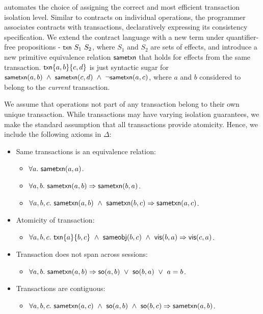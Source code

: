 \quelea automates the choice of assigning the correct and most efficient
transaction isolation level. Similar to contracts on individual operations, the
programmer associates contracts with transactions, declaratively expressing its
consistency specification. We extend the contract language with a new term
under quantifier-free propositions - ${\small {\normalfont \textsf{txn}}}~S_1~S_2$, where $S_1$ and
$S_2$ are sets of effects, and introduce a new primitive equivalence relation
$\small {\normalfont \textsf{sametxn}}$ that holds for effects from the same transaction. $\small
{\normalfont \textsf{txn}}\{a,b\}\{c,d\}$ is just syntactic sugar for $\small {\normalfont \textsf{sametxn}(a,b)} ~\wedge~
{\normalfont \textsf{sametxn}(c,d)} ~\wedge~ \neg{\normalfont \textsf{sametxn}(a,c)}$, where $a$ and $b$ considered to
belong to the \emph{current} transaction.

We assume that operations not part of any transaction belong to their own
unique transaction. While transactions may have varying isolation guarantees,
we make the standard assumption that all transactions provide atomicity. Hence,
we include the following axioms in $\Delta$:

\begin{itemize}
\item Same transactions is an equivalence relation:
	\begin{itemize}
	\item $\forall a.~{\normalfont \textsf{sametxn}(a,a)}$.
	\item $\forall a,b.~{\normalfont \textsf{sametxn}(a,b)} \Rightarrow {\normalfont \textsf{sametxn}(b,a)}$.
	\item $\forall a,b,c.~{\normalfont \textsf{sametxn}(a,b)} ~\wedge~ {\normalfont \textsf{sametxn}(b,c)} \Rightarrow {\normalfont \textsf{sametxn}(a,c)}$.
	\end{itemize}
\item Atomicity of transaction:
	\begin{itemize}
	\item $\forall a,b,c.~{\normalfont \textsf{txn}}\{a\}\{b,c\} ~\wedge~ {\normalfont \textsf{sameobj}(b,c)} ~\wedge~ {\normalfont \textsf{vis}(b,a)} \Rightarrow {\normalfont \textsf{vis}(c,a)}$.
	\end{itemize}
\item Transaction does not span across sessions:
	\begin{itemize}
	\item $\forall a,b.~{\normalfont \textsf{sametxn}(a,b)} \Rightarrow {\normalfont \textsf{so}(a,b)} ~\vee~ {\normalfont \textsf{so}(b,a)} ~\vee~ a = b$.
	\end{itemize}
\item Transactions are contiguous:
	\begin{itemize}
	\item $\forall a,b,c.~{\normalfont \textsf{sametxn}(a,c)} ~\wedge~ {\normalfont \textsf{so}(a,b)} ~\wedge~ {\normalfont \textsf{so}(b,c)} \Rightarrow {\normalfont \textsf{sametxn}(a,b)}$.
	\end{itemize}
\end{itemize}


